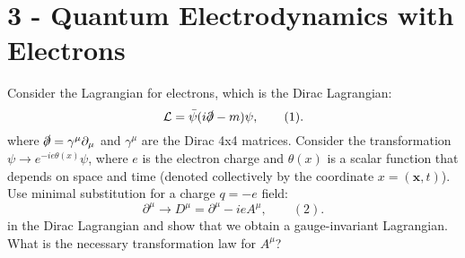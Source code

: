\documentclass[working, oneside]{../../../Preambles/tuftebook}
\begin{document}
\let\cleardoublepage\clearpage
\thispagestyle{fancy}
\chapter{3 - Quantum Electrodynamics with Electrons}
\begin{exercise}[1]
Consider the Lagrangian for electrons, which is the Dirac Lagrangian:
\[
 \mathcal{L} = \bar{\psi} (i\slashed{\partial} - m) \psi, \qquad (1)
.\]
where \( \slashed{\partial} = \gamma^\mu \partial_\mu \) and \( \gamma^\mu \) are the Dirac 4x4 matrices. Consider the transformation \( \psi \rightarrow e^{-ie\theta(x)}\psi \), where \( e \) is the electron charge and \( \theta(x) \) is a scalar function that depends on space and time (denoted collectively by the coordinate \( x = (\mathbf{x}, t) \)). Use minimal substitution for a charge \( q = -e \) field:
\[
\partial^\mu \rightarrow D^\mu = \partial^\mu - ieA^\mu, \qquad (2) 
.\] 
in the Dirac Lagrangian and show that we obtain a gauge-invariant Lagrangian. What is the necessary transformation law for \( A^\mu \)?
\end{exercise}
\end{document}
